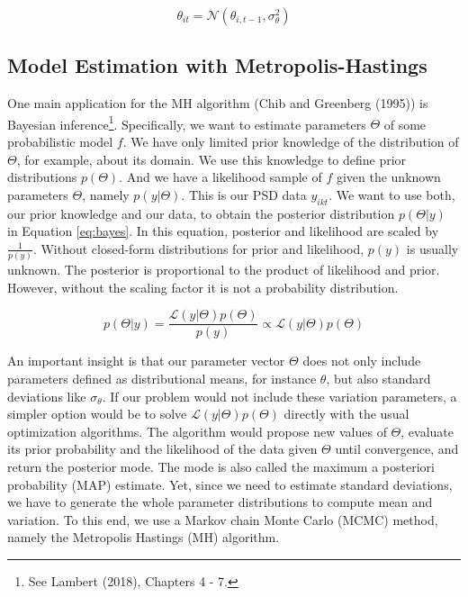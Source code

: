 \documentclass[12pt,english,a4paper,oneside]{article}
\theoremstyle{definition}
\theoremstyle{definition}
\theoremstyle{definition}
\theoremstyle{definition}
\theoremstyle{remark}
\begin{document}
\begin{equation}
\label{eq:dynamics}
\theta_{it} = \mathcal{N}(\theta_{i,t-1}, \sigma_{\theta}^2)
\end{equation}

\hypertarget{model-estimation-with-metropolis-hastings}{%
\subsection{Model Estimation with Metropolis-Hastings}\label{model-estimation-with-metropolis-hastings}}

One main application for the MH algorithm (Chib and Greenberg (1995)) is Bayesian inference\footnote{See Lambert (2018), Chapters 4 - 7.}. Specifically, we want to estimate parameters \(\Theta\) of some probabilistic model \(f\). We have only limited prior knowledge of the distribution of \(\Theta\), for example, about its domain. We use this knowledge to define prior distributions \(p(\Theta)\). And we have a likelihood sample of \(f\) given the unknown parameters \(\Theta\), namely \(p(y|\Theta)\). This is our PSD data \(y_{ikt}\). We want to use both, our prior knowledge and our data, to obtain the posterior distribution \(p(\Theta|y)\) in Equation \eqref{eq:bayes}. In this equation, posterior and likelihood are scaled by \(\frac{1}{p(y)}\). Without closed-form distributions for prior and likelihood, \(p(y)\) is usually unknown. The posterior is proportional to the product of likelihood and prior. However, without the scaling factor it is not a probability distribution.

\begin{equation}
\label{eq:bayes}
p(\Theta|y) = \frac{\mathcal{L}(y|\Theta)p(\Theta)}{p(y)} \propto \mathcal{L}(y|\Theta)p(\Theta)
\end{equation}

\noindent
An important insight is that our parameter vector \(\Theta\) does not only include
parameters defined as distributional means, for instance \(\theta\), but also
standard deviations like \(\sigma_{\theta}\). If our problem would not include these
variation parameters, a simpler option would be to solve \(\mathcal{L}(y|\Theta)p(\Theta)\) directly with the usual optimization algorithms. The algorithm would
propose new values of \(\Theta\), evaluate its prior probability and the likelihood of
the data given \(\Theta\) until convergence, and return the posterior mode. The mode is also called the maximum a posteriori probability (MAP) estimate. Yet, since we need to estimate standard deviations,
we have to generate the whole parameter distributions to compute mean and variation. To this end, we use a Markov chain Monte Carlo (MCMC) method, namely the Metropolis Hastings (MH) algorithm.
\end{document}
